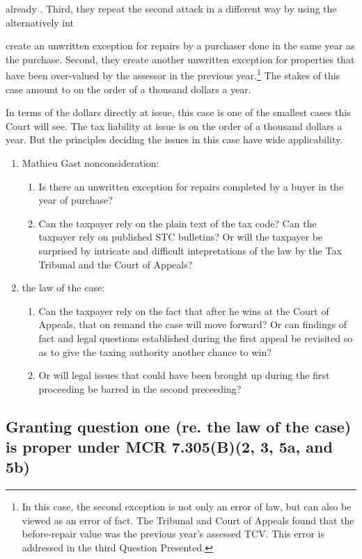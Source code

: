 \documentclass[12pt,\documentclassflag]{michiganCourtOfAppealsBrief}
\begin{document}
already  . Third, they repeat the second attack in a different way by using the alternatively int


create an unwritten exception for repairs by a purchaser done in the same year as the purchase. Second, they create another unwritten exception for properties that have been over-valued by the assessor in the previous year.\footnote{In this case, the second exception is not only an error of law, but can also be viewed as an error of fact. The Tribunal and Court of Appeals found that the before-repair value was the previous year's assessed TCV. This error is addressed in the third Question Presented.} 
The stakes of this case amount to on the order of a thousand dollars a year.

In terms of the dollars directly at issue, this case is one of the smallest cases this Court will see. The tax liability at issue is on the order of a thousand dollars a year. But the principles deciding the issues in this case have wide applicability.

\begin{enumerate}
\item Mathieu Gast nonconsideration:
  \begin{enumerate}
  \item Is there an unwritten exception for repairs completed by a buyer in the year of purchase?
  \item Can the taxpayer rely on the plain text of the tax code? Can the taxpayer rely on published STC bulletins? Or will the taxpayer be surprised by intricate and difficult intepretations of the law by the Tax Tribunal and the Court of Appeals? 
  \end{enumerate}

\item the law of the case:
  \begin{enumerate}
  \item Can the taxpayer rely on the fact that after he wins at the Court of Appeals, that on remand the case will move forward? Or can findings of fact and legal questions established during the first appeal be revisited so as to give the taxing authority another chance to win?
  \item Or will legal issues that could have been brought up during the first proceeding be barred in the second preceeding?
  \end{enumerate}
\end{enumerate}

\subsection{Granting question one (re. the law of the case) is proper under MCR 7.305(B)(2, 3, 5a, and 5b)}
\end{document}
